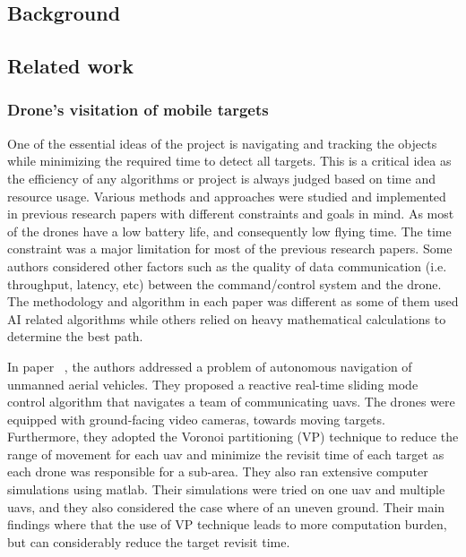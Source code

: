 \documentclass[../main.tex]{subfiles}
\begin{document}
\subsection{Background}

\blindtext

\subsection{Related work}

	\subsubsection{Drone's visitation of mobile targets}

One of the essential ideas of the project is navigating and tracking the objects while minimizing the required time to detect all targets. 
This is a critical idea as the efficiency of any algorithms or project is always judged based on time and resource usage.
Various methods and approaches were studied and implemented in previous research papers with different constraints and goals in mind.
As most of the drones have a low battery life, and consequently low flying time. The time constraint was a major limitation for most of the previous research papers. 
Some authors considered other factors such as the quality of data communication (i.e. throughput, latency, etc) between the command/control system and the drone.
The methodology and algorithm in each paper was different as some of them used AI related algorithms while others relied on heavy mathematical calculations to determine the best path.

In paper ~\cite{hua20}, the authors \citeauthor{hua20} addressed a problem of autonomous navigation of unmanned aerial vehicles. 
They proposed a reactive real-time sliding mode control algorithm that navigates a team of communicating \glspl{uav}.
The drones were equipped with ground-facing video cameras, towards moving targets. 
Furthermore, they adopted the Voronoi partitioning (VP) technique to reduce the range of movement for each \gls{uav} and minimize the revisit time of each target as each drone was responsible for a sub-area.
They also ran extensive computer simulations using matlab. Their simulations were tried on one \gls{uav} and multiple \glspl{uav},
and they also considered the case where of an uneven ground. 
Their main findings where that the use of VP technique leads to more computation burden, but can considerably reduce the target revisit time.
\end{document}
